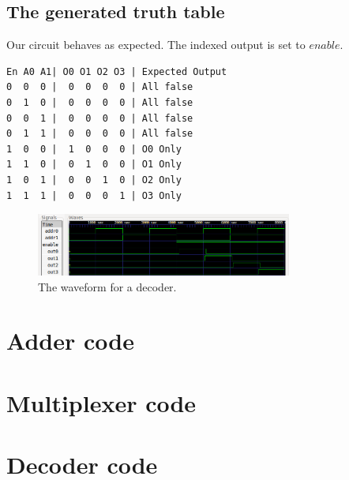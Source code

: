 \documentclass[]{article}
\begin{document}
\subsection{The generated truth table}

Our circuit behaves as expected. The indexed output is set to $enable$.

\begin{lstlisting}
En A0 A1| O0 O1 O2 O3 | Expected Output
0  0  0 |  0  0  0  0 | All false
0  1  0 |  0  0  0  0 | All false
0  0  1 |  0  0  0  0 | All false
0  1  1 |  0  0  0  0 | All false
1  0  0 |  1  0  0  0 | O0 Only
1  1  0 |  0  1  0  0 | O1 Only
1  0  1 |  0  0  1  0 | O2 Only
1  1  1 |  0  0  0  1 | O3 Only
\end{lstlisting}

\begin{figure}[H]
	\centering
	\includegraphics[width=0.75\textwidth]{../wave_forms/decoder_wave.png}
				
	\caption{The waveform for a decoder.}
\end{figure}

\appendix

\section{Adder code}



\section{Multiplexer code} \label{plexer}



\section{Decoder code} \label{decoder}


\end{document}
